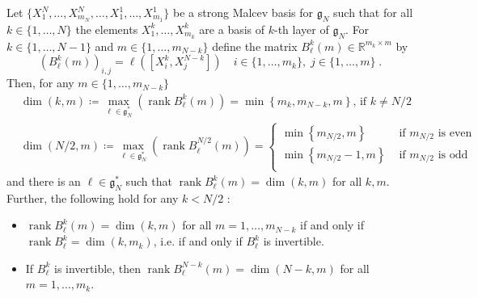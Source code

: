 \documentclass[10pt,a4paper]{amsart}
\newcommand{\fancyg}{\mathfrak{g}}
\newcommand{\rank}{\operatorname{rank}}
\begin{document}
	\begin{corollary}\label{cor: max rank of blm}
		Let $\{X_1^N, \ldots, X_{m_N}^N, \ldots,X_1^1, \ldots, X_{m_1}^1\}$ be a strong Malcev basis for $\fancyg_N$ such that for all $k \in \{1, \ldots, N\}$ the elements $X_1^k, \ldots, X_{m_k}^k$ are a basis of $k$-th layer of $\fancyg_N$. For $k \in \{1,\ldots, N-1\}$ and $m \in \{1,\ldots,m_{N-k}\}$ define the matrix $B_{\ell}^k(m) \in \mathbb{R}^{m_k\times m}$ by
		\[(B_{\ell}^k(m))_{i,j} = \ell([X_i^k,X_j^{N-k}]) \quad i \in \{1, \ldots, m_k\}, \;j \in \{1, \ldots, m\} \;.\]
		Then, for any $m \in \{1, \ldots, m_{N-k}\}$
		\begin{align*}
			&\operatorname{dim}(k,m) \coloneqq \max_{\ell \in \fancyg_{N}^*}\left(\operatorname{rank}B_{\ell}^k(m)\right)=
			\min\left\{m_k,m_{N-k},m\right\} \text{, if } k \neq N/2\\
			&\operatorname{dim}(N/2,m) \coloneqq \max_{\ell \in \fancyg_{N}^*}\left(\operatorname{rank}B_{\ell}^{N/2}(m)\right) = \begin{cases}
				\min\left\{m_{N/2},m\right\} &\text{ if } m_{N/2} \text{ is even}\\
				\min\left\{m_{N/2}-1,m\right\} &\text{ if } m_{N/2} \text{ is odd}\\
			\end{cases}
		\end{align*}
		and there is an $\ell \in \fancyg_{N}^*$ such that $\operatorname{rank}B_{\ell}^k(m) = \dim(k,m)$ for all $k,m$.\\
		Further, the following hold for any $k < N/2$ :
		\begin{itemize}
			\item[i)] $\operatorname{rank}B_{\ell}^k(m) = \dim(k,m)$ for all $m = 1, \ldots, m_{N-k}$ if and only if $\rank B_{\ell}^k = \dim(k,m_k)$, i.e. if and only if $B_{\ell}^k$ is invertible.
			\item[ii)] If $B_{\ell}^k$ is invertible, then $\operatorname{rank}B_{\ell}^{N-k}(m) = \dim(N-k,m)$ for all $m = 1, \ldots, m_{k}$.
		\end{itemize}
	\end{corollary}
\end{document}
